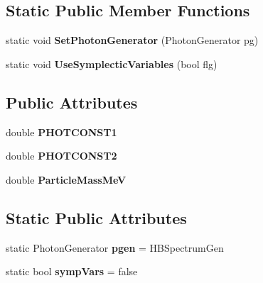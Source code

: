 \subsection*{Static Public Member Functions}
\begin{DoxyCompactItemize}
\item 
\mbox{\label{classParticleTracking_1_1SynchRadParticleProcess_a98407ef45df9976efcc41d3be55d3eda}} 
static void {\bfseries Set\+Photon\+Generator} (Photon\+Generator pg)
\item 
\mbox{\label{classParticleTracking_1_1SynchRadParticleProcess_aedf6577e9c1eee50279a45f3970c6ab3}} 
static void {\bfseries Use\+Symplectic\+Variables} (bool flg)
\end{DoxyCompactItemize}
\subsection*{Public Attributes}
\begin{DoxyCompactItemize}
\item 
\mbox{\label{classParticleTracking_1_1SynchRadParticleProcess_a6ea54c01412941738ca6491401a6558b}} 
double {\bfseries P\+H\+O\+T\+C\+O\+N\+S\+T1}
\item 
\mbox{\label{classParticleTracking_1_1SynchRadParticleProcess_a6bf5eaaf60305b255c7bcc264ffac1b3}} 
double {\bfseries P\+H\+O\+T\+C\+O\+N\+S\+T2}
\item 
\mbox{\label{classParticleTracking_1_1SynchRadParticleProcess_a1d20d234322172e3a07d4b21b9e412ef}} 
double {\bfseries Particle\+Mass\+MeV}
\end{DoxyCompactItemize}
\subsection*{Static Public Attributes}
\begin{DoxyCompactItemize}
\item 
\mbox{\label{classParticleTracking_1_1SynchRadParticleProcess_ae59f8c8b49962762fae62876db84a8e1}} 
static Photon\+Generator {\bfseries pgen} = H\+B\+Spectrum\+Gen
\item 
\mbox{\label{classParticleTracking_1_1SynchRadParticleProcess_a7d76a71a1865586206417c8aaa561e53}} 
static bool {\bfseries symp\+Vars} = false
\end{DoxyCompactItemize}
